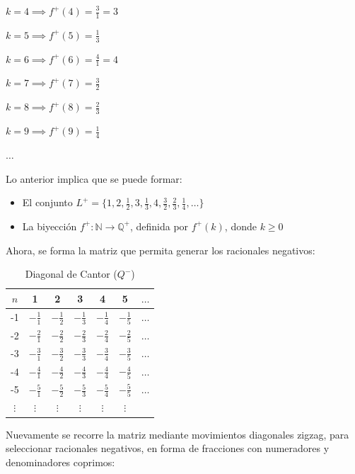 \documentclass{article}
\begin{document}
$k = 4 \implies f^+(4) = \frac{3}{1} = 3$

$k = 5 \implies f^+(5) = \frac{1}{3}$

$k = 6 \implies f^+(6) = \frac{4}{1} = 4$

$k = 7 \implies f^+(7) = \frac{3}{2}$

$k = 8 \implies f^+(8) = \frac{2}{3}$

$k = 9 \implies f^+(9) = \frac{1}{4}$

$\dots$

Lo anterior implica que se puede formar:

\begin{itemize}
    \item El conjunto $L^+ = \{1, 2, \frac{1}{2}, 3, \frac{1}{3}, 4, \frac{3}{2}, \frac{2}{3}, \frac{1}{4}, \dots\}$
    \item La biyección $f^+ : \mathbb{N} \to \mathbb{Q^+}$, definida por $f^+(k)$, donde $k \ge 0$
\end{itemize}

Ahora, se forma la matriz que permita generar los racionales negativos:

\begin{table}[H]
\centering
\renewcommand{\arraystretch}{1.5}
\begin{tabular}{c|cccccc}
$n$ & 1 & 2 & 3 & 4 & 5 & $\dots$ \\ \hline
-1 & \color{red}$-\frac{1}{1}$ & $-\frac{1}{2}$ & $-\frac{1}{3}$ & $-\frac{1}{4}$ & $-\frac{1}{5}$ & $\dots$ \\
-2 & $-\frac{2}{1}$ & \color{red}$-\frac{2}{2}$ & $-\frac{2}{3}$ & $-\frac{2}{4}$ & $-\frac{2}{5}$ & $\dots$ \\
-3 & $-\frac{3}{1}$ & $-\frac{3}{2}$ & \color{red}$-\frac{3}{3}$ & $-\frac{3}{4}$ & $-\frac{3}{5}$ & $\dots$ \\
-4 & $-\frac{4}{1}$ & $-\frac{4}{2}$ & $-\frac{4}{3}$ & \color{red}$-\frac{4}{4}$ & $-\frac{4}{5}$ & $\dots$ \\
-5 & $-\frac{5}{1}$ & $-\frac{5}{2}$ & $-\frac{5}{3}$ & $-\frac{5}{4}$ & \color{red}$-\frac{5}{5}$ & $\dots$ \\
$\vdots$ & $\vdots$ & $\vdots$ & $\vdots$ & $\vdots$ & $\vdots$
\end{tabular}
\caption{Diagonal de Cantor ($Q^-$)}
\end{table}

Nuevamente se recorre la matriz mediante movimientos diagonales zigzag, para seleccionar racionales negativos, en forma de fracciones con numeradores y denominadores coprimos:
\end{document}

